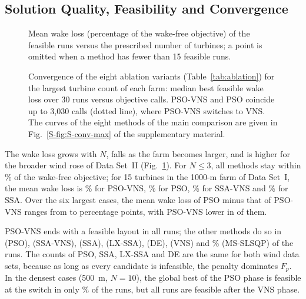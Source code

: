 \subsection{Solution Quality, Feasibility and Convergence}
\label{sec:quality}
\begin{figure}[!t]
\centering
{}
\caption{Mean wake loss (percentage of the wake-free objective) of the feasible runs versus the prescribed number of turbines; a point is omitted when a method has fewer than 15 feasible runs.}
\label{fig:wakeloss}
\end{figure}
\begin{figure}[!t]
\centering
{}
\caption{Convergence of the eight ablation variants (Table~\ref{tab:ablation}) for the largest turbine count of each farm: median best feasible wake loss over 30 runs versus objective calls. PSO-VNS and PSO coincide up to 3,030 calls (dotted line), where PSO-VNS switches to VNS. The curves of the eight methods of the main comparison are given in Fig.~\ref{S-fig:S-conv-max} of the supplementary material.}
\label{fig:conv-max}
\label{fig:ablation}
\end{figure}

The wake loss grows with $N$, falls as the farm becomes larger, and is higher for the broader wind rose of Data Set~II (Fig.~\ref{fig:wakeloss}). For $N\le3$, all methods stay within \NLossMaxSmallN\% of the wake-free objective; for 15 turbines in the 1000-m farm of Data Set~I, the mean wake loss is \NLossBigIPSOVNS\% for PSO-VNS, \NLossBigIPSO\% for PSO, \NLossBigISSAVNS\% for SSA-VNS and \NLossBigISSA\% for SSA. Over the six largest cases, the mean wake loss of PSO minus that of PSO-VNS ranges from \NBigGainMin{} to \NBigGainMax{} percentage points, with PSO-VNS lower in \NBigGainPos{} of them.

PSO-VNS ends with a feasible layout in all runs; the other methods do so in \NFeasPSO{} (PSO), \NFeasSSAVNS{} (SSA-VNS), \NFeasSSA{} (SSA), \NFeasLXSSA{} (LX-SSA), \NFeasDE{} (DE), \NFeasVNS{} (VNS) and \NFeasSLSQP\% (MS-SLSQP) of the runs. The counts of PSO, SSA, LX-SSA and DE are the same for both wind data sets, because as long as every candidate is infeasible, the penalty dominates $F_p$. In the densest cases (500~m, $N=10$), the global best of the PSO phase is feasible at the switch in only \NDenseSwitchFeas\% of the runs, but all runs are feasible after the VNS phase.

